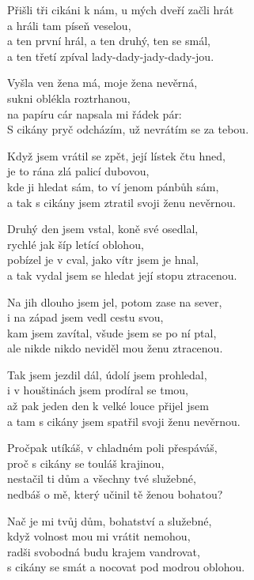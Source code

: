
\ve{}
Přišli tři cikáni k nám, u mých dveří začli hrát\\
a hráli tam píseň veselou,\\
a ten první hrál, a ten druhý, ten se smál,\\
a ten třetí zpíval lady-dady-jady-dady-jou.

\ve{}
Vyšla ven žena má, moje žena nevěrná,\\
sukni oblékla roztrhanou,\\
na papíru cár napsala mi řádek pár:\\
S cikány pryč odcházím, už nevrátím se za tebou.

\ve{}
Když jsem vrátil se zpět, její lístek čtu hned,\\
je to rána zlá palicí dubovou,\\
kde ji hledat sám, to ví jenom pánbůh sám,\\
a tak s cikány jsem ztratil svoji ženu nevěrnou.

\ve{}
Druhý den jsem vstal, koně své osedlal,\\
rychlé jak šíp letící oblohou,\\
pobízel je v cval, jako vítr jsem je hnal,\\
a tak vydal jsem se hledat její stopu ztracenou.

\ve{}
Na jih dlouho jsem jel, potom zase na sever,\\
i na západ jsem vedl cestu svou,\\
kam jsem zavítal, všude jsem se po ní ptal,\\
ale nikde nikdo neviděl mou ženu ztracenou.

\ve{}
Tak jsem jezdil dál, údolí jsem prohledal,\\
i v houštinách jsem prodíral se tmou,\\
až pak jeden den k velké louce přijel jsem\\
a tam s cikány jsem spatřil svoji ženu nevěrnou.

\ve{}
Pročpak utíkáš, v chladném poli přespáváš,\\
proč s cikány se touláš krajinou,\\
nestačil ti dům a všechny tvé služebné,\\
nedbáš o mě, který učinil tě ženou bohatou?

\ve{}
Nač je mi tvůj dům, bohatství a služebné,\\
když volnost mou mi vrátit nemohou,\\
radši svobodná budu krajem vandrovat,\\
s cikány se smát a nocovat pod modrou oblohou. 

\esong